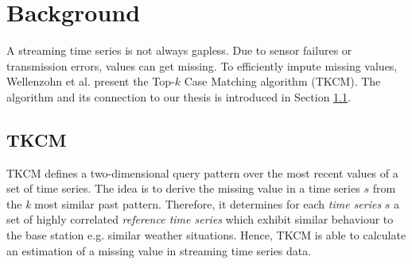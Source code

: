 \documentclass[abstracton,12pt]{scrreprt}
\begin{document}
\newtheorem{defn}{Definition}[section]
\newtheorem{exmp}{Example}[section]
\newcommand*{\argmin}{\operatornamewithlimits{argmin}\limits}

\chapter{Background}
\label{background}
A streaming time series is not always gapless. Due to sensor failures or transmission errors, values can get missing. To efficiently impute missing values, Wellenzohn et al.\cite{BScT} present the Top-$k$ Case Matching algorithm (TKCM). The algorithm and its connection to our thesis is introduced in Section \ref{TKCM}.

\section{TKCM}
\label{TKCM}
TKCM defines a two-dimensional query pattern over the most recent values of a set of time series. 
The idea is to derive the missing value in a time series $s$ from the \emph{k} most similar past pattern. Therefore, it determines for each \emph{time series} $s$ a set of highly correlated \emph{reference time series} which exhibit similar behaviour to the base station e.g. similar weather situations. Hence, TKCM is able to calculate an estimation of a missing value in streaming time series data. 
\end{document}

